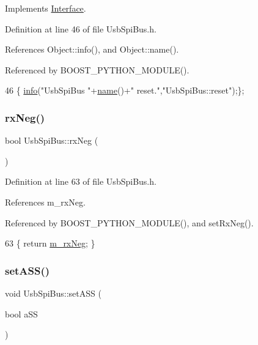 Implements \hyperlink{classInterface_a4d44329cea9981a9e0392eaaf99efadd}{Interface}.



Definition at line 46 of file Usb\+Spi\+Bus.\+h.



References Object\+::info(), and Object\+::name().



Referenced by B\+O\+O\+S\+T\+\_\+\+P\+Y\+T\+H\+O\+N\+\_\+\+M\+O\+D\+U\+L\+E().


\begin{DoxyCode}
46 \{ \hyperlink{classObject_a644fd329ea4cb85f54fa6846484b84a8}{info}(\textcolor{stringliteral}{"UsbSpiBus "}+\hyperlink{classObject_a300f4c05dd468c7bb8b3c968868443c1}{name}()+\textcolor{stringliteral}{" reset."},\textcolor{stringliteral}{"UsbSpiBus::reset"});\};
\end{DoxyCode}
\mbox{\label{classUsbSpiBus_ab24f6e85697305b26997b8dec3f18254}} 
\subsubsection{\texorpdfstring{rx\+Neg()}{rxNeg()}}
{\footnotesize\ttfamily bool Usb\+Spi\+Bus\+::rx\+Neg (\begin{DoxyParamCaption}{ }\end{DoxyParamCaption})\hspace{0.3cm}{\ttfamily [inline]}}



Definition at line 63 of file Usb\+Spi\+Bus.\+h.



References m\+\_\+rx\+Neg.



Referenced by B\+O\+O\+S\+T\+\_\+\+P\+Y\+T\+H\+O\+N\+\_\+\+M\+O\+D\+U\+L\+E(), and set\+Rx\+Neg().


\begin{DoxyCode}
63 \{ \textcolor{keywordflow}{return} \hyperlink{classUsbSpiBus_abf36f2df24c3ec5363efe73c9771bbc8}{m\_rxNeg}; \}
\end{DoxyCode}
\mbox{\label{classUsbSpiBus_a1a0278c7994ba1fa84919383bd816047}} 
\subsubsection{\texorpdfstring{set\+A\+S\+S()}{setASS()}}
{\footnotesize\ttfamily void Usb\+Spi\+Bus\+::set\+A\+SS (\begin{DoxyParamCaption}\item[{bool}]{a\+SS }\end{DoxyParamCaption})\hspace{0.3cm}{\ttfamily [inline]}}



